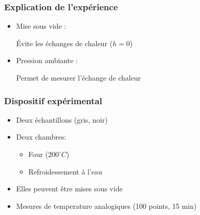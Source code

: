 \documentclass{beamer}
\begin{document}
\begin{frame}
\frametitle{Explication de l'expérience}

\begin{itemize}
    \item Mise sous vide :

    Évite les échanges de chaleur ($h = 0$)

    \item Pression ambiante :

    Permet de mesurer l’échange de chaleur
\end{itemize}

\end{frame}



\begin{frame}
\frametitle{Dispositif expérimental}

\begin{itemize}
	\item{Deux échantillons (gris, noir)\newline}
	\item{Deux chambres:\newline
	\begin{itemize}
		\item{Four ($200^{\circ}C$)\newline}
		\item{Refroidessement à l'eau\newline}
	\end{itemize}}
	\item{Elles peuvent être mises sous vide\newline}
	\item{Mesures de temperature analogiques (100 points, 15 min)}
\end{itemize}
\end{frame}
\end{document}

